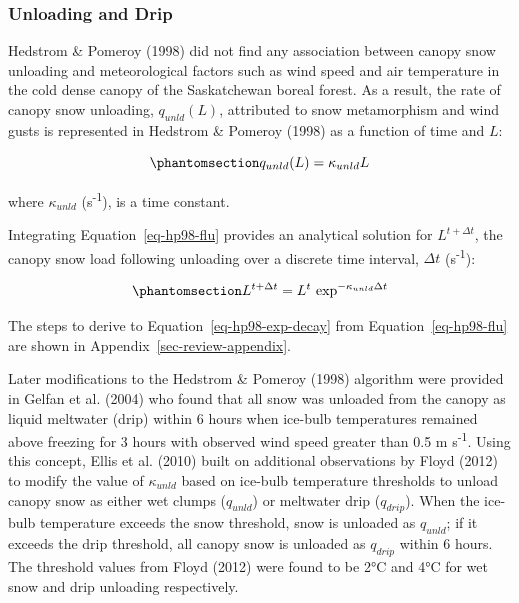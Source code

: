 \documentclass[
  letterpaper,
]{tex/uofsthesis-cs}
\begin{document}
\subsubsection{Unloading and Drip}\label{sec-unloading}

Hedstrom \& Pomeroy (1998) did not find any association between canopy
snow unloading and meteorological factors such as wind speed and air
temperature in the cold dense canopy of the Saskatchewan boreal forest.
As a result, the rate of canopy snow unloading, \(q_{unld}(L)\),
attributed to snow metamorphism and wind gusts is represented in
Hedstrom \& Pomeroy (1998) as a function of time and \(L\):

\begin{equation}\phantomsection\label{eq-hp98-flu}{
q_{unld}(L) = \kappa_{unld} L
}\end{equation}

where \(\kappa_{unld}\) (s\textsuperscript{-1}), is a time constant.

Integrating Equation~\ref{eq-hp98-flu} provides an analytical solution
for \(L^{t+\Delta t}\), the canopy snow load following unloading over a
discrete time interval, \(\Delta t\) (s\textsuperscript{-1}):

\begin{equation}\phantomsection\label{eq-hp98-exp-decay}{
L^{t+\Delta t} =L^t\  \text{exp} ^{-\kappa_{unld}\Delta t}
}\end{equation}

The steps to derive to Equation~\ref{eq-hp98-exp-decay} from
Equation~\ref{eq-hp98-flu} are shown in
Appendix~\ref{sec-review-appendix}.

Later modifications to the Hedstrom \& Pomeroy (1998) algorithm were
provided in Gelfan et al. (2004) who found that all snow was unloaded
from the canopy as liquid meltwater (drip) within 6 hours when ice-bulb
temperatures remained above freezing for 3 hours with observed wind
speed greater than 0.5 m s\textsuperscript{-1}. Using this concept,
Ellis et al. (2010) built on additional observations by Floyd (2012) to
modify the value of \(\kappa_{unld}\) based on ice-bulb temperature
thresholds to unload canopy snow as either wet clumps (\(q_{unld}\)) or
meltwater drip (\(q_{drip}\)). When the ice-bulb temperature exceeds the
snow threshold, snow is unloaded as \(q_{unld}\); if it exceeds the drip
threshold, all canopy snow is unloaded as \(q_{drip}\) within 6 hours.
The threshold values from Floyd (2012) were found to be 2°C and 4°C for
wet snow and drip unloading respectively.
\end{document}
